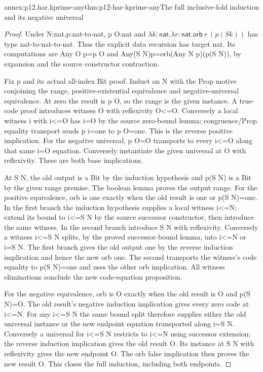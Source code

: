\begin{annexitem}{annex:p12.har.kprime-any}{thm:p12-har-kprime-any}{The full inclusive-fold induction and its negative universal}
\begin{proof}
Under N:nat,p:nat-to-nat, p O:nat and
\(\lambda k:\mathsf{nat}.\lambda r:\mathsf{nat}.
\mathsf{orb}\ r\ (p(S k))\) has type nat-to-nat-to-nat.
Thus the explicit data recursion has target nat. Its computations are
Any O p=p O and Any(S N)p=orb(Any N p)(p(S N)), by expansion
and the source constructor contraction.

Fix p and its actual all-index Bit proof. Induct on N with the Prop
motive conjoining the range, positive-existential equivalence and
negative-universal equivalence. At zero the result is p O, so the
range is the given instance. A true-code proof introduces witness O
with reflexivity O<=O. Conversely a local witness i with i<=O has
i=O by the source zero-bound lemma; congruence/Prop equality transport
sends p i=one to p O=one. This is the reverse positive implication.
For the negative universal, p O=O transports to every i<=O along
that same i=O equation. Conversely instantiate the given universal at
O with reflexivity. These are both base implications.

At S N, the old output is a Bit by the induction hypothesis and
p(S N) is a Bit by the given range premise. The boolean lemma proves
the output range. For the positive equivalence, orb is one exactly
when the old result is one or p(S N)=one. In the first branch the
induction hypothesis supplies a local witness i<=N; extend its bound
to i<=S N by the source successor constructor, then introduce the
same witness. In the second branch introduce S N with reflexivity.
Conversely a witness i<=S N splits, by the proved successor-bound
lemma, into i<=N or i=S N. The first branch gives the old output
one by the reverse induction implication and hence the new orb one.
The second transports the witness's code equality to p(S N)=one
and uses the other orb implication. All witness eliminations conclude
the new code-equation proposition.

For the negative equivalence, orb is O exactly when the old result
is O and p(S N)=O. The old result's negative induction implication
gives every zero code at i<=N. For any i<=S N the same bound split
therefore supplies either the old universal instance or the new endpoint
equation transported along i=S N. Conversely a universal for i<=S N
restricts to i<=N using successor extension; the reverse induction
implication gives the old result O. Its instance at S N with reflexivity
gives the new endpoint O. The orb false implication then proves the
new result O. This closes the full induction, including both endpoints.


\end{proof}
\end{annexitem}
